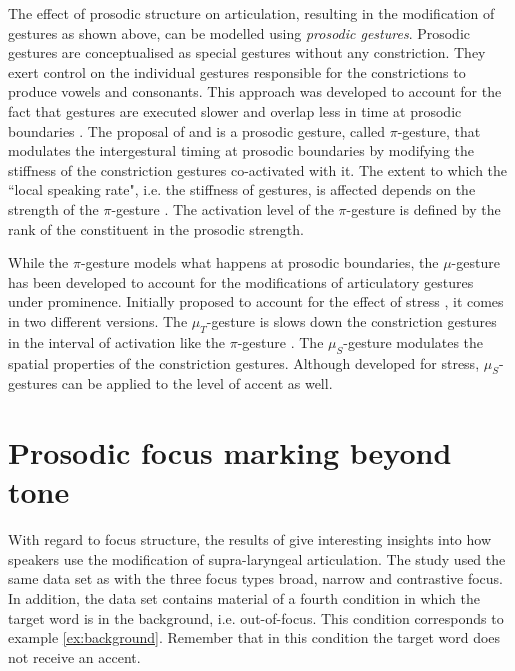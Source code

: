 The effect of prosodic structure on articulation, resulting in the modification of gestures as shown above, can be modelled using \emph{prosodic gestures}. Prosodic gestures are conceptualised as special gestures without any constriction. They exert control on the individual gestures responsible for the constrictions to produce vowels and consonants. This approach was developed to account for the fact that gestures are executed slower and overlap less in time at prosodic boundaries \citep{Byrd2000, ChoKeating2001, Fougeron2001, Tabain2003, Cho2006, KrivokapicByrd2012}. The proposal of \citet{Byrdetal2000} and \citet{ByrdSaltzman2003} is a prosodic gesture, called $\pi$-gesture, that modulates the intergestural timing at prosodic boundaries by modifying the stiffness of the constriction gestures co-activated with it. The extent to which the ``local speaking rate", i.e. the stiffness of gestures, is affected depends on the strength of the $\pi$-gesture \citep[13]{Byrd2000}. The activation level of the $\pi$-gesture is defined by the rank of the constituent in the prosodic strength.

While the $\pi$-gesture models what happens at prosodic boundaries, the $\mu$-ges\-ture has been developed to account for the modifications of articulatory gestures under prominence. Initially proposed to account for the effect of stress \citep{Saltzmanetal2008}, it comes in two different versions. The $\mu_T$-gesture is slows down the constriction gestures in the interval of activation like the $\pi$-gesture \citep{Krivokapic2014}. The $\mu_S$-gesture modulates the spatial properties of the constriction gestures. Although developed for stress, $\mu_S$-gestures can be applied to the level of accent as well.

\section{Prosodic focus marking beyond tone}
\label{sec:focus3}

With regard to focus structure, the results of \citet{MückeGrice2014} give interesting insights into how speakers use the modification of supra-laryngeal articulation. The study used the same data set as \citet{Griceetal2017} with the three focus types broad, narrow and contrastive focus. In addition, the data set contains material of a fourth condition in which the target word is in the background, i.e. out-of-focus. This condition corresponds to example \ref{ex:background}. Remember that in this condition the target word does not receive an accent. 

